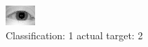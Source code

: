 \begin{figure}[h!]
\begin{center}
\includegraphics[width=0.60\columnwidth]{figures/ID886_class_1_target_2.png}
\end{center}
\caption{ Classification: 1 actual target: 2}
\label{fig:ID886_class_1_target_2}
\end{figure}
